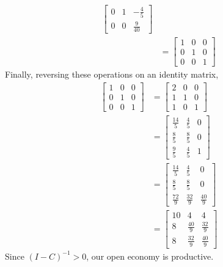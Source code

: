 \documentclass[11pt, letterpaper, twoside]{article}
\begin{document}
\begin{enumerate}
\begin{align*}
\begin{bmatrix}
0 & 1 & -\frac{4}{5}\\
0 & 0 & \frac{9}{40}
\end{bmatrix}\\
&=\begin{bmatrix}
1 & 0 & 0\\
0 & 1 & 0\\
0 & 0 & 1
\end{bmatrix}
\end{align*}
Finally, reversing these operations on an identity matrix,
\begin{align*}
\begin{bmatrix}
1 & 0 & 0\\
0 & 1 & 0\\
0 & 0 & 1
\end{bmatrix} &= \begin{bmatrix}
2 & 0 & 0\\
1 & 1 & 0\\
1 & 0 & 1
\end{bmatrix}\\
&=\begin{bmatrix}
\frac{14}{5} & \frac{4}{5} & 0\\
\frac{8}{5} & \frac{8}{5} & 0\\
\frac{9}{5} & \frac{4}{5} & 1
\end{bmatrix}\\
&=\begin{bmatrix}
\frac{14}{5} & \frac{4}{5} & 0\\
\frac{8}{5} & \frac{8}{5} & 0\\
\frac{72}{9} & \frac{32}{9} & \frac{40}{9}
\end{bmatrix}\\
&=\begin{bmatrix}
10 & 4 & 4\\
8 & \frac{40}{9} & \frac{32}{9}\\
8 & \frac{32}{9} & \frac{40}{9}
\end{bmatrix}
\end{align*}
Since $(I-C)^{-1}>0$, our open economy is productive.
\end{enumerate}
\end{document}
